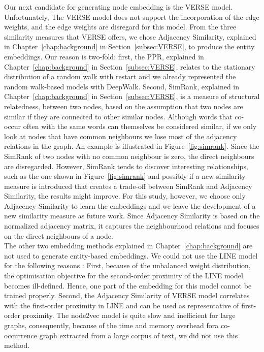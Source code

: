 Our next candidate for generating node embedding is the VERSE model. Unfortunately, The VERSE model does not support the incorporation of the edge weights, and the edge weights are disregard for this model. From the three similarity measures that VERSE offers, we chose Adjacency Similarity, explained in Chapter~\ref{chap:background} in Section~\ref{subsec:VERSE}, to produce the entity embeddings. Our reason is two-fold: first, the PPR, explained in Chapter~\ref{chap:background} in Section~\ref{subsec:VERSE}, relates to the stationary distribution of a random walk with restart and we already represented the random walk-based models with DeepWalk.
Second, SimRank, explained in Chapter~\ref{chap:background} in Section~\ref{subsec:VERSE}, is a measure of structural relatedness, between two nodes, based on the assumption that two nodes are similar if they are connected to other similar nodes. Although words that co-occur often with the same words can themselves be considered similar, if we only look at nodes that have common neighbours we lose most of the adjacency relations in the graph. An example is illustrated in Figure~\ref{fig:simrank}. Since the SimRank of two nodes with no common neighbour is zero, the direct neighbours are disregarded. However, SimRank tends to discover interesting relationships, such as the one shown in Figure~\ref{fig:simrank} and possibly if a new similarity measure is introduced that creates a trade-off between SimRank and Adjacency Similarity, the results might improve. For this study, however, we choose only Adjacency Similarity to learn the embeddings and we leave the development of a new similarity measure as future work. 
Since Adjacency Similarity is based on the normalized adjacency matrix, it captures the neighbourhood relations and focuses on the direct neighbours of a node.\\
The other two embedding methods explained in Chapter~\ref{chap:background} are not used to generate entity-based embeddings. We could not use the LINE model for the following reasons : First, because of the unbalanced weight distribution, the optimisation objective for the second-order proximity of the LINE model becomes ill-defined. Hence, one part of the embedding for this model cannot be trained properly. Second, the Adjacency Similarity of VERSE model correlates with the first-order proximity in LINE and can be used as representative of first-order proximity. The node2vec model is quite slow and inefficient for large graphs, consequently, because of the time and memory overhead fora co-occurrence graph extracted from a large corpus of text, we did not use this method.  \\
